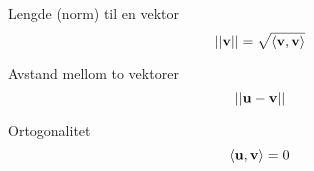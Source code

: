 Lengde (norm) til en vektor
$$||\mathbf{v}|| = \sqrt{\langle\mathbf{v},\mathbf{v}\rangle}$$

Avstand mellom to vektorer
$$||\mathbf{u}-\mathbf{v}||$$

Ortogonalitet
$$\langle\mathbf{u},\mathbf{v}\rangle = 0$$
